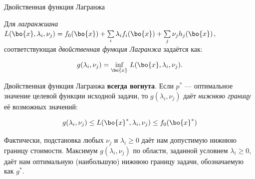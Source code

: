 \documentclass{beamer}
\begin{document}
\begin{frame}{Двойственная функция Лагранжа}
	\begin{flushleft}
		
		Для \emph{лагранжиана} $L(\bo{x}, \lambda_i, \nu_j) = 
		f_0(\bo{x}) + 
		\sum\limits_i \lambda_i f_i(\bo{x}) +
		\sum\limits_j \nu_j h_j(\bo{x})$, соответствующая 
		\emph{двойственная функция Лагранжа} задаётся как:
		
		\begin{equation}
			g(\lambda_i, \nu_j)  = \underset{\bo{x}}{\text{inf}}
			\ L(\bo{x}, \lambda_i, \nu_j).
		\end{equation}
		
		Двойственная функция Лагранжа \textbf{всегда вогнута}. Если $p^*$ — оптимальное значение целевой функции исходной задачи, то $g(\lambda_i, \nu_j)$ даёт \emph{нижнюю границу} её возможных значений:
		
		\begin{equation}
			g(\lambda_i, \nu_j)  \leq L(\bo{x}^*, \lambda_i, \nu_j)  \leq f_0(\bo{x}^*)
		\end{equation}
		
		Фактически, подстановка любых $\nu_j$ и $\lambda_i \geq 0$ даёт нам допустимую нижнюю границу стоимости. Максимум $g(\lambda_i, \nu_j)$ по области, заданной условием $\lambda_i \geq 0$, даёт нам оптимальную (наибольшую) нижнюю границу задачи, обозначаемую как $g^*$. 
		
	\end{flushleft}
\end{frame}
\end{document}

